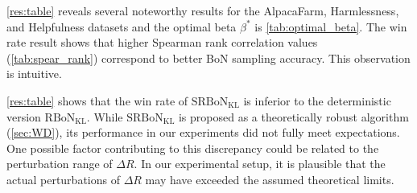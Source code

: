 

\cref{res:table} reveals several noteworthy results for the AlpacaFarm, Harmlessness, and Helpfulness datasets and the optimal beta $\beta^*$ is \cref{tab:optimal_beta}.
The win rate result shows that higher Spearman rank correlation values (\cref{tab:spear_rank}) correspond to better BoN sampling accuracy. This observation is intuitive. 

\cref{res:table} shows that the win rate of $\mathrm{SRBoN}_{\mathrm{KL}}$ is inferior to the deterministic version $\mathrm{RBoN}_{\mathrm{KL}}$. While $\mathrm{SRBoN}_{\mathrm{KL}}$ is proposed as a theoretically robust algorithm (\cref{sec:WD}), its performance in our experiments did not fully meet expectations. One possible factor contributing to this discrepancy could be related to the perturbation range of $\Delta R$. In our experimental setup, it is plausible that the actual perturbations of $\Delta R$ may have exceeded the assumed theoretical limits. 

